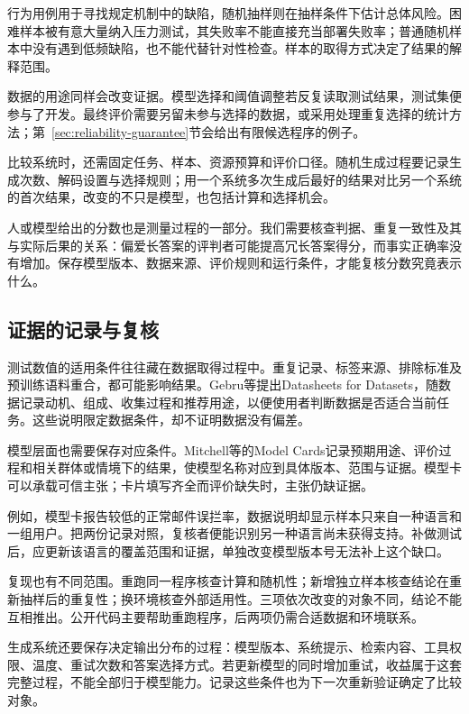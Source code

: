 行为用例用于寻找规定机制中的缺陷，随机抽样则在抽样条件下估计总体风险。困难样本被有意大量纳入压力测试，其失败率不能直接充当部署失败率；普通随机样本中没有遇到低频缺陷，也不能代替针对性检查。样本的取得方式决定了结果的解释范围。

数据的用途同样会改变证据。模型选择和阈值调整若反复读取测试结果，测试集便参与了开发。最终评价需要另留未参与选择的数据，或采用处理重复选择的统计方法；第~\ref{sec:reliability-guarantee}节会给出有限候选程序的例子。

比较系统时，还需固定任务、样本、资源预算和评价口径。随机生成过程要记录生成次数、解码设置与选择规则；用一个系统多次生成后最好的结果对比另一个系统的首次结果，改变的不只是模型，也包括计算和选择机会。

人或模型给出的分数也是测量过程的一部分。我们需要核查判据、重复一致性及其与实际后果的关系：偏爱长答案的评判者可能提高冗长答案得分，而事实正确率没有增加。保存模型版本、数据来源、评价规则和运行条件，才能复核分数究竟表示什么。

\subsection{证据的记录与复核}

测试数值的适用条件往往藏在数据取得过程中。重复记录、标签来源、排除标准及预训练语料重合，都可能影响结果。Gebru等提出Datasheets for Datasets，随数据记录动机、组成、收集过程和推荐用途，以便使用者判断数据是否适合当前任务。这些说明限定数据条件，却不证明数据没有偏差。

模型层面也需要保存对应条件。Mitchell等的Model Cards记录预期用途、评价过程和相关群体或情境下的结果，使模型名称对应到具体版本、范围与证据。模型卡可以承载可信主张；卡片填写齐全而评价缺失时，主张仍缺证据。

例如，模型卡报告较低的正常邮件误拦率，数据说明却显示样本只来自一种语言和一组用户。把两份记录对照，复核者便能识别另一种语言尚未获得支持。补做测试后，应更新该语言的覆盖范围和证据，单独改变模型版本号无法补上这个缺口。

复现也有不同范围。重跑同一程序核查计算和随机性；新增独立样本核查结论在重新抽样后的重复性；换环境核查外部适用性。三项依次改变的对象不同，结论不能互相推出。公开代码主要帮助重跑程序，后两项仍需合适数据和环境联系。

生成系统还要保存决定输出分布的过程：模型版本、系统提示、检索内容、工具权限、温度、重试次数和答案选择方式。若更新模型的同时增加重试，收益属于这套完整过程，不能全部归于模型能力。记录这些条件也为下一次重新验证确定了比较对象。

